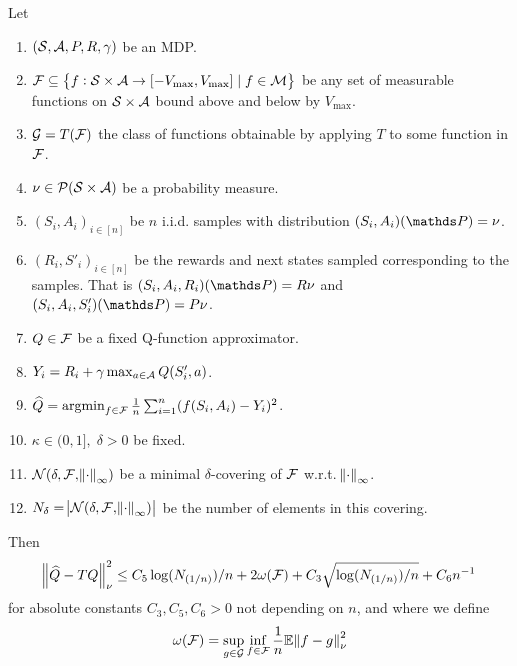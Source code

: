 
\begin{thm}\label{thm:oneStep}
  Let
  \begin{enumerate}
    \item $(\mathcal{S}, \mathcal{A}, P, R, \gamma)$ be an MDP.
    \item $\mathcal{F} \subseteq 
      \left\{ f : \mathcal{S} \times \mathcal{A} \to [-V_{\max}, V_{\max}]
      \mid f \in \mathcal{M} \right\}$
      be any set of measurable functions on $\mathcal{S} \times \mathcal{A}$
      bound above and below by $V_{\max}$.
    \item $\mathcal{G} = T(\mathcal{F})$ the class of functions obtainable by
      applying $T$ to some function in $\mathcal{F}$.
    \item $\nu \in \mathcal{P}(\mathcal{S} \times \mathcal{A})$ be a probability measure.
    \item $(S_i, A_i)_{i\in[n]}$ be $n$ i.i.d. samples with distribution
      $(S_i, A_i)(\Prob) = \nu$.
    \item $(R_i, S'_i)_{i\in[n]}$ be the rewards and next states sampled
      corresponding to the samples.
      That is $(S_i, A_i, R_i)(\Prob) = R \nu$
      and $(S_i, A_i, S'_i)(\Prob) = P \nu$. 
    \item $Q \in \mathcal{F}$ be a fixed Q-function approximator.
    \item $Y_i = R_i + \gamma \max_{a \in \mathcal{A}} Q(S'_i, a)$.
    \item $\widehat{Q} = \operatorname*{argmin}_{f \in \mathcal{F}} \frac{1}{n}
      \sum_{i=1}^n (f(S_i, A_i) - Y_i)^2$.
    \item $\kappa \in (0,1],\; \delta > 0$ be fixed.
    \item $\mathcal{N}(\delta, \mathcal{F}, \norm{\cdot}_\infty)$
      be a minimal $\delta$-covering of $\mathcal{F}$ w.r.t. $\norm{\cdot}_\infty$.
    \item $N_\delta = \abs{\mathcal{N}(\delta, \mathcal{F}, \norm{\cdot}_\infty)}$
      be the number of elements in this covering.
  \end{enumerate}
  Then
  \begin{align*}
    \norm{\widehat{Q} - TQ}_\nu^2
    \leq C_5 \log(N_{(1/n)})/n
    + 2 \omega(\mathcal{F})
    + C_3 \sqrt{\log(N_{(1/n)})/n} + C_6 n^{-1}
  \end{align*}
  for absolute constants $C_3, C_5, C_6 > 0$ not depending on
  $n$, and where we define
  \begin{equation}
    \omega(\mathcal{F}) = \sup_{g \in \mathcal{G}} \inf_{f \in \mathcal{F}}
    \frac{1}{n} \mathbb{E} \norm{f - g}_\nu^2
    \label{eq:defomega}
  \end{equation}
\end{thm}

